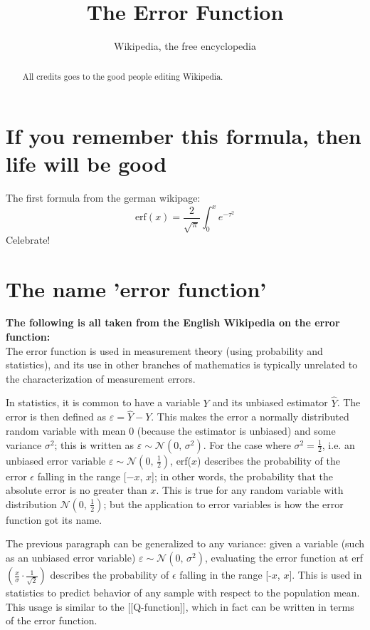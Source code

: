 \documentclass[twocolumn]{article}
\begin{document}
\title{The Error Function}
\author{Wikipedia, the free encyclopedia}
\date{}
\maketitle
\begin{abstract}
All credits goes to the good people editing Wikipedia.
\end{abstract}

\section{If you remember this formula, then life will be good}
The first formula from the german wikipage:
\begin{equation}
\textrm{erf}(x) = \frac 2{\sqrt\pi} \int_0^x e^{-\tau^2}
\label{eq-error}
\end{equation}
Celebrate!

\section{The name 'error function'}
\textbf{The following is all taken from the English Wikipedia on the error function:}\\

The error function is used in measurement theory (using probability and statistics), and its use in other branches of mathematics is typically unrelated to the characterization of measurement errors.

In statistics, it is common to have a variable $Y$ and its unbiased estimator $\hat{Y}$. The error is then defined as $\varepsilon = \hat{Y} - Y$. This makes the error a normally distributed random variable with mean 0 (because the estimator is unbiased) and some variance $\sigma^2$; this is written as $\varepsilon \sim \mathcal{N}(0,\,\sigma^2)$. For the case where $\sigma^2 = \frac{1}{2}$, i.e. an unbiased error variable $\varepsilon \sim \mathcal{N}(0,\,\frac{1}{2})$, erf($x$) describes the probability of the error $\epsilon$ falling in the range [−$x$, $x$]; in other words, the probability that the absolute error is no greater than $x$. This is true for any random variable with distribution $\mathcal{N}(0,\,\frac{1}{2})$; but the application to error variables is how the error function got its name.

The previous paragraph can be generalized to any variance: given a variable (such as an unbiased error variable) $\varepsilon \sim \mathcal{N}(0,\,\sigma^2)$, evaluating the error function at erf$\left( \frac{x}{\sigma} \cdot \frac{1}{\sqrt{2}} \right)$ describes the probability of $\epsilon$ falling in the range [-$x$, $x$]. This is used in statistics to predict behavior of any sample with respect to the population mean. This usage is similar to the [[Q-function]], which in fact can be written in terms of the error function.
\end{document}
